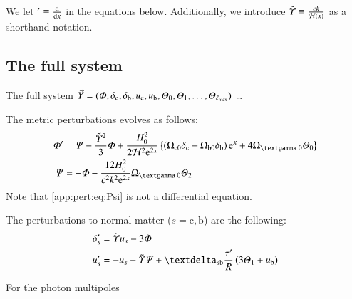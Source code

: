 



We let $' \equiv \dv{}{x}$ in the equations below. Additionally, we introduce $\tilde{\varUpsilon}\equiv \frac{ck}{\mathcal{H}(x)}$ as a shorthand notation.


\subsection{The full system}

The full system $\vec{Y}=(\varPhi, \delta_\mathrm{c}, \delta_\mathrm{b}, u_\mathrm{c}, u_\mathrm{b}, \varTheta_0, \varTheta_1, \dots, \varTheta_{\ell_\mathrm{max}})$ \dots

The metric perturbations evolves as follows:
\begin{subequations}\label{app:pert:eq:metric_perturbations}
\begin{align}
    \Phi' &= \Psi - \frac{\ckH^2}{3} \Phi + \frac{H_0^2}{2\Hp^2\eu[2x]}\left\{ \left(\Omega\ped{c 0}\delta\ped{c} + \Omega\ped{b 0}\delta\ped{b} \right)\eu[x]+4\Omega\gped{\textgamma 0}\Theta_0\right\} \label{app:pert:eq:dPhidx}\\
    \Psi &= - \Phi - \frac{12H_0^2}{c^2k^2\eu^{2x}} \Omega\gped{\textgamma 0}\Theta_2 \label{app:pert:eq:Psi}
\end{align}
\end{subequations}
Note that \cref{app:pert:eq:Psi} is not a differential equation.

The perturbations to normal matter ($s=\mathrm{c,b}$) are the following:
\begin{subequations}\label{app:pert:eq:matter_perturbations}
\begin{align}
    \delta_s'&=  \ckH u_s - 3\dot{\Phi}\label{app:pert:eq:ddelta_sdx}  \\
    u_s' &= - u_s - \ckH\Psi + \deltasym{s\mathrm{b}}  \frac{\tau'}{R} \left(3\Theta_1 +u\ped{b}\right)\label{app:pert:eq:du_sdx} 
\end{align}
\end{subequations}

For the photon multipoles 


